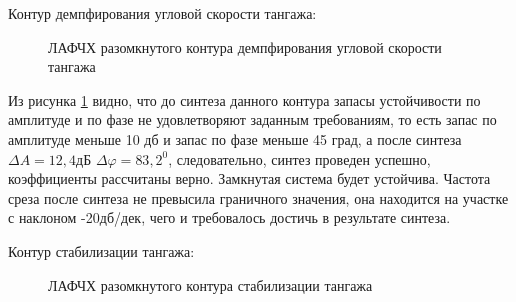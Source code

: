 \begin{center}
    Контур демпфирования угловой скорости тангажа:
\end{center}

\begin{figure}[H]
    \caption{ЛАФЧХ разомкнутого контура демпфирования угловой скорости тангажа}
    \label{fig:Угловая скорость тангажа раз qKR}
\end{figure}

Из рисунка \ref{fig:Угловая скорость тангажа раз qKR} видно, что до синтеза данного контура запасы устойчивости по амплитуде и по фазе не удовлетворяют заданным требованиям, то есть запас по амплитуде меньше 10 дб и запас по фазе меньше 45 град, а после синтеза $\Delta A = 12,4 $дБ $\Delta \varphi = 83,2^0$, следовательно, синтез проведен успешно, коэффициенты рассчитаны верно. Замкнутая система будет устойчива. Частота среза после синтеза не превысила граничного значения, она находится на участке с наклоном -20дб/дек, чего и требовалось достичь в результате синтеза.  

\begin{center}
    Контур стабилизации тангажа:
\end{center}

\begin{figure}[H]
    \caption{ЛАФЧХ разомкнутого контура стабилизации тангажа}
    \label{fig:Тангаж раз qKR}
\end{figure}

